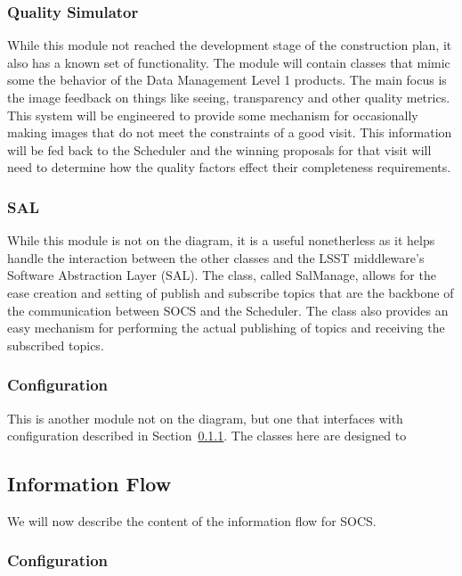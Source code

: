 \documentclass[]{spie}  %
\begin{document}
\subsubsection{Quality Simulator}

While this module not reached the development stage of the construction plan, it also has a known set of functionality. The module will contain classes that mimic some the behavior of the Data Management Level 1 products. The main focus is the image feedback on things like seeing, transparency and other quality metrics. This system will be engineered to provide some mechanism for occasionally making images that do not meet the constraints of a good visit. This information will be fed back to the Scheduler and the winning proposals for that visit will need to determine how the quality factors effect their completeness requirements.

\subsubsection{SAL}

While this module is not on the diagram, it is a useful nonetherless as it helps handle the interaction between the other classes and the LSST middleware's Software Abstraction Layer (SAL). The class, called SalManage, allows for the ease creation and setting of publish and subscribe topics that are the backbone of the communication between SOCS and the Scheduler. The class also provides an easy mechanism for performing the actual publishing of topics and receiving the subscribed topics.

\subsubsection{Configuration}

This is another module not on the diagram, but one that interfaces with configuration described in Section~\ref{sec:code-config}. The classes here are designed to 

\subsection{Information Flow}

We will now describe the content of the information flow for SOCS.

\subsubsection{Configuration}
\label{sec:code-config}
\end{document}
